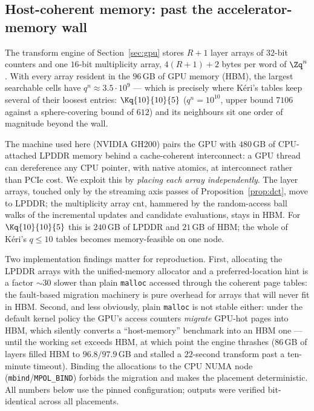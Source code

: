 
\subsection{Host-coherent memory: past the accelerator-memory
wall}\label{sec:gpu:hc}

The transform engine of Section~\ref{sec:gpu} stores $R+1$ layer arrays of
$32$-bit counters and one $16$-bit multiplicity array, $4(R{+}1)+2$ bytes
per word of $\Zq^n$. With every array resident in the $96$\,GB of GPU
memory (HBM), the largest searchable cells have $q^n\approx 3.5\cdot 10^9$
--- which is precisely where K\'eri's tables keep several of their loosest
entries: $\Kq{10}{10}{5}$ ($q^n=10^{10}$, upper bound $7106$ against a
sphere-covering bound of $612$) and its neighbours sit one order of
magnitude beyond the wall.

The machine used here (NVIDIA GH200) pairs the GPU with $480$\,GB of
CPU-attached LPDDR memory behind a cache-coherent interconnect: a GPU
thread can dereference any CPU pointer, with native atomics, at
interconnect rather than PCIe cost. We exploit this by \emph{placing each
array independently}. The layer arrays, touched only by the streaming axis
passes of Proposition~\ref{prop:dct}, move to LPDDR; the multiplicity
array $\mathrm{cnt}$, hammered by the random-access ball walks of the
incremental updates and candidate evaluations, stays in HBM. For
$\Kq{10}{10}{5}$ this is $240$\,GB of LPDDR and $21$\,GB of HBM; the whole
of K\'eri's $q\le 10$ tables becomes memory-feasible on one node.

Two implementation findings matter for reproduction. First, allocating
the LPDDR arrays with the unified-memory allocator and a
preferred-location hint is a factor $\sim\!30$ slower than plain
\texttt{malloc} accessed through the coherent page tables: the fault-based
migration machinery is pure overhead for arrays that will never fit in
HBM. Second, and less obviously, plain \texttt{malloc} is not stable
either: under the default kernel policy the GPU's access counters
\emph{migrate} GPU-hot pages into HBM, which silently converts a
``host-memory'' benchmark into an HBM one --- until the working set
exceeds HBM, at which point the engine thrashes ($86$\,GB of layers
filled HBM to $96.8/97.9$\,GB and stalled a $22$-second transform past a
ten-minute timeout). Binding the allocations to the CPU NUMA node
(\texttt{mbind}/\texttt{MPOL\_BIND}) forbids the migration and makes the
placement deterministic. All numbers below use the pinned configuration;
outputs were verified bit-identical across all placements.


